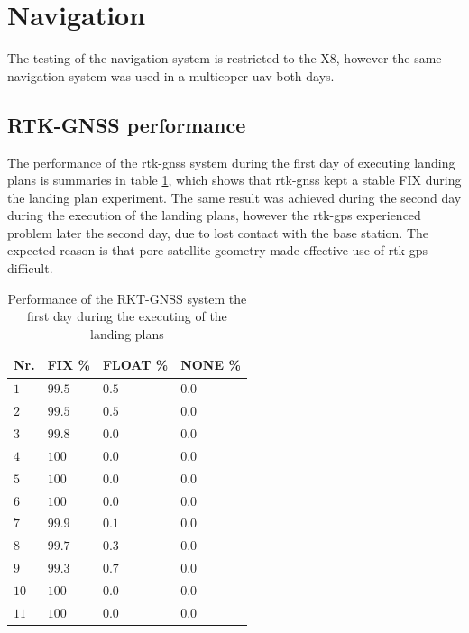 \section{Navigation}\label{ss:EXNavigation}
The testing of the navigation system is restricted to the X8, however the same navigation system was used in a multicoper \gls{uav} both days.
\subsection{RTK-GNSS performance}
The performance of the \gls{rtk-gnss} system during the first day of executing landing plans is summaries in table \ref{TB:RTKFirstDayRTK}, which shows that \gls{rtk-gnss} kept a stable FIX during the landing plan experiment. The same result was achieved during the second day during the execution of the landing plans, however the \gls{rtk-gps} experienced problem later the second day, due to lost contact with the base station. The expected reason is that pore satellite geometry made effective use of \gls{rtk-gps} difficult.
\begin{table}[H]
\centering
\begin{tabular}{| l | l | l | l |}
\hline
\textbf{Nr.}	& \textbf{FIX \%}	& \textbf{FLOAT \%}	& \textbf{NONE \%}	\\ \hline
$1$				& $99.5 $	& $0.5$	& $0.0$									\\ \hline
$2$				& $99.5 $	& $0.5$	& $0.0$									\\ \hline
$3$				& $99.8 $	& $0.0$	& $0.0$									\\ \hline
$4$				& $100$		& $0.0$	& $0.0$									\\ \hline
$5$				& $100$		& $0.0$	& $0.0$									\\ \hline
$6$				& $100$		& $0.0$	& $0.0$									\\ \hline
$7$				& $99.9$	& $0.1$	& $0.0$									\\ \hline
$8$				& $99.7 $ 	& $0.3$	& $0.0$									\\ \hline
$9$				& $99.3$	& $0.7$	& $0.0$									\\ \hline
$10$			& $100$		& $0.0$	& $0.0$									\\ \hline
$11$			& $100$		& $0.0$	& $0.0$									\\ \hline
\end{tabular}
\caption{Performance of the RKT-GNSS system the first day during the executing of the landing plans}
\label{TB:RTKFirstDayRTK}
\end{table}
